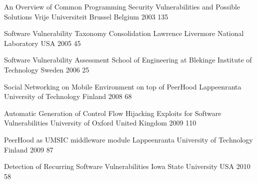 \renewcommand{\refname}{\MakeUppercase{\ReferencesTitle}}
\cleardoublepage
{}
{}

\begin{comment}
INSTRUCTIONS FOR WRITING A MASTER'S THESIS

References are either in alphabetical order (according to the first author) or in the order of
citing. All references are in one list only. All bibliographic information is included. If a
reference is a thesis then the type of the thesis is included in the reference, i.e. mention
either “bachelor’s thesis”, “master’s thesis” or “doctoral thesis”.
\end{comment}

\begin{thebibliography}{9}


		{}
		{An Overview of Common Programming Security Vulnerabilities and Possible Solutions}
		{Vrije Universiteit Brussel}
		{Belgium}
		{2003}
		{135}
	
		{}
		{Software Vulnerability Taxonomy Consolidation}
		{Lawrence Livermore National Laboratory}
		{USA}
		{2005}
		{45}
	
		{}
		{Software Vulnerability Assessment}
		{School of Engineering at Blekinge Institute of Technology}
		{Sweden}
		{2006}
		{25}
	
		{}
		{Social Networking on Mobile Environment on top of PeerHood}
		{Lappeenranta University of Technology}
		{Finland}
		{2008}
		{68}
	
		{}
		{Automatic Generation of Control Flow Hijacking Exploits for Software Vulnerabilities}
		{University of Oxford}
		{United Kingdom}
		{2009}
		{110}

		{}
		{PeerHood as UMSIC middleware module}
		{Lappeenranta University of Technology}
		{Finland}
		{2009}
		{87}
	
		{}
		{Detection of Recurring Software Vulnerabilities}
		{Iowa State University}
		{USA}
		{2010}
		{58}
	

\end{thebibliography}
